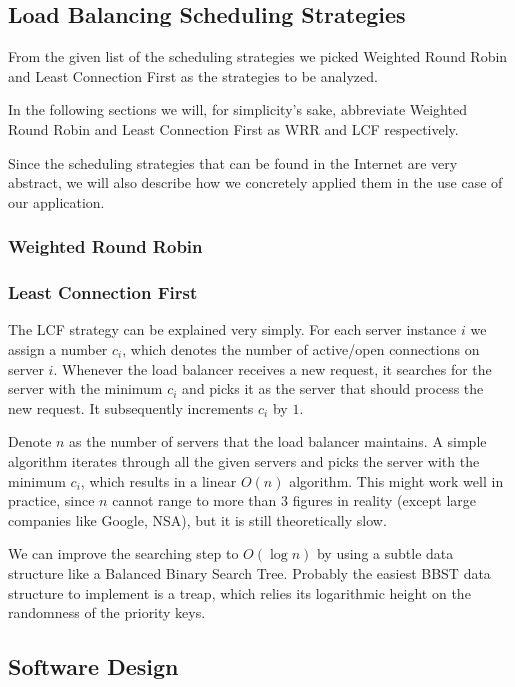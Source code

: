 \documentclass[11pt, a4paper]{article}
\begin{document}

\subsection{Load Balancing Scheduling Strategies}
\label{subsec:strategy}
From the given list of the scheduling strategies we picked Weighted
Round Robin and Least Connection First as the strategies to be
analyzed.

In the following sections we will, for simplicity's sake, abbreviate
Weighted Round Robin and Least Connection First as WRR and LCF
respectively.

Since the scheduling strategies that can be found in the Internet are
very abstract, we will also describe how we concretely applied them in
the use case of our application. 

\subsubsection{Weighted Round Robin}


\subsubsection{Least Connection First}

The LCF strategy can be explained very simply. For each server
instance $i$ we assign a number $c_i$, which denotes the number of
active/open connections on server $i$. Whenever the load balancer
receives a new request, it searches for the server with the minimum
$c_i$ and picks it as the server that should process the new
request. It subsequently increments $c_i$ by $1$. 

Denote $n$ as the number of servers that the load balancer
maintains. A simple algorithm iterates through all the given servers
and picks the server with the minimum $c_i$, which results in a linear
$O(n)$ algorithm. This might work well in practice, since $n$ cannot
range to more than 3 figures in reality (except large companies like
Google, NSA), but it is still theoretically slow. 

We can improve the searching step to $O(\log n)$ by using a subtle
data structure like a Balanced Binary Search Tree. Probably the
easiest BBST data structure to implement is a treap, which relies its
logarithmic height on the randomness of the priority keys.

\subsection{Software Design}
\end{document}
